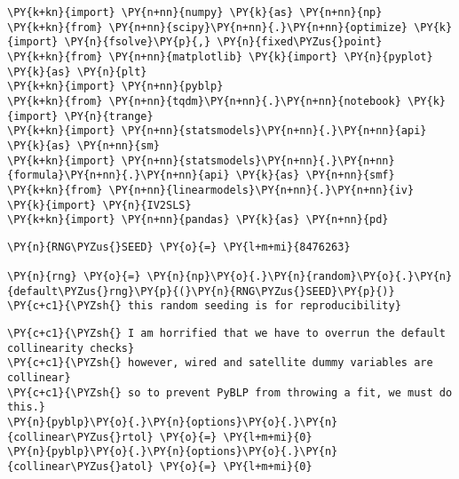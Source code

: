 

    \begin{tcolorbox}[breakable, size=fbox, boxrule=1pt, pad at break*=1mm,colback=cellbackground, colframe=cellborder]
\begin{Verbatim}[commandchars=\\\{\}]
\PY{k+kn}{import} \PY{n+nn}{numpy} \PY{k}{as} \PY{n+nn}{np}
\PY{k+kn}{from} \PY{n+nn}{scipy}\PY{n+nn}{.}\PY{n+nn}{optimize} \PY{k}{import} \PY{n}{fsolve}\PY{p}{,} \PY{n}{fixed\PYZus{}point}
\PY{k+kn}{from} \PY{n+nn}{matplotlib} \PY{k}{import} \PY{n}{pyplot} \PY{k}{as} \PY{n}{plt}
\PY{k+kn}{import} \PY{n+nn}{pyblp}
\PY{k+kn}{from} \PY{n+nn}{tqdm}\PY{n+nn}{.}\PY{n+nn}{notebook} \PY{k}{import} \PY{n}{trange}
\PY{k+kn}{import} \PY{n+nn}{statsmodels}\PY{n+nn}{.}\PY{n+nn}{api} \PY{k}{as} \PY{n+nn}{sm}
\PY{k+kn}{import} \PY{n+nn}{statsmodels}\PY{n+nn}{.}\PY{n+nn}{formula}\PY{n+nn}{.}\PY{n+nn}{api} \PY{k}{as} \PY{n+nn}{smf}
\PY{k+kn}{from} \PY{n+nn}{linearmodels}\PY{n+nn}{.}\PY{n+nn}{iv} \PY{k}{import} \PY{n}{IV2SLS}
\PY{k+kn}{import} \PY{n+nn}{pandas} \PY{k}{as} \PY{n+nn}{pd}
\end{Verbatim}
\end{tcolorbox}

    \begin{tcolorbox}[breakable, size=fbox, boxrule=1pt, pad at break*=1mm,colback=cellbackground, colframe=cellborder]
\begin{Verbatim}[commandchars=\\\{\}]
\PY{n}{RNG\PYZus{}SEED} \PY{o}{=} \PY{l+m+mi}{8476263}

\PY{n}{rng} \PY{o}{=} \PY{n}{np}\PY{o}{.}\PY{n}{random}\PY{o}{.}\PY{n}{default\PYZus{}rng}\PY{p}{(}\PY{n}{RNG\PYZus{}SEED}\PY{p}{)} \PY{c+c1}{\PYZsh{} this random seeding is for reproducibility}
\end{Verbatim}
\end{tcolorbox}

    \begin{tcolorbox}[breakable, size=fbox, boxrule=1pt, pad at break*=1mm,colback=cellbackground, colframe=cellborder]
\begin{Verbatim}[commandchars=\\\{\}]
\PY{c+c1}{\PYZsh{} I am horrified that we have to overrun the default collinearity checks}
\PY{c+c1}{\PYZsh{} however, wired and satellite dummy variables are collinear}
\PY{c+c1}{\PYZsh{} so to prevent PyBLP from throwing a fit, we must do this.}
\PY{n}{pyblp}\PY{o}{.}\PY{n}{options}\PY{o}{.}\PY{n}{collinear\PYZus{}rtol} \PY{o}{=} \PY{l+m+mi}{0}
\PY{n}{pyblp}\PY{o}{.}\PY{n}{options}\PY{o}{.}\PY{n}{collinear\PYZus{}atol} \PY{o}{=} \PY{l+m+mi}{0}
\end{Verbatim}
\end{tcolorbox}

